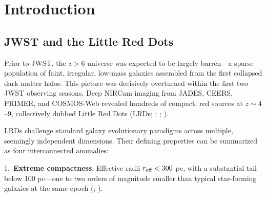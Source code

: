 \documentclass[apj,twocolumn,longbibliography,linenumbers]{aastex701}
\begin{document}
\begin{abstract}
I propose density-dependent effective gravity, $G_{\rm eff}(\Sigma) = G_N[1 + \varepsilon_g(\Sigma/\Sigma_0)^\beta]$, as a mechanism-agnostic phenomenological framework that unifies the four LRD anomalies through a single variable $\Sigma$: deeper potential wells enhance gravitational redshift (reddening) and virial velocities (line broadening) without requiring dust thermal re-emission (MIR silence). A four-layer gravitational redshift model demonstrates that $G_{\rm eff} > G_N$ introduces a monotonic, $\Sigma$-dependent color modulation detectable through rank-order statistics, even though the absolute magnitude shift (${\sim}10^{-4}$\,mag) is small relative to the observed color excess. I present five falsifiable predictions (P1--P5) and conclude that surface density is the fundamental organizing parameter of LRD spectral properties---any complete framework must incorporate $\Sigma$ as an independent degree of freedom.
\end{abstract}


\section{Introduction}

\subsection{JWST and the Little Red Dots}

Prior to JWST, the $z > 6$ universe was expected to be largely barren---a sparse population of faint, irregular, low-mass galaxies assembled from the first collapsed dark matter halos. This picture was decisively overturned within the first two JWST observing seasons. Deep NIRCam imaging from JADES, CEERS, PRIMER, and COSMOS-Web revealed hundreds of compact, red sources at $z \sim 4$--$9$, collectively dubbed Little Red Dots (LRDs; \citealt{Labbe2023}; \citealt{Kokorev2024}; \citealt{Adams2024}).

LRDs challenge standard galaxy evolutionary paradigms across multiple, seemingly independent dimensions. Their defining properties can be summarized as four interconnected anomalies:

1.~\textbf{Extreme compactness}. Effective radii $r_{\rm eff} < 300$ pc, with a substantial tail below 100 pc---one to two orders of magnitude smaller than typical star-forming galaxies at the same epoch (\citealt{Fujimoto2023}; \citealt{Kocevski2024}).
\end{document}
